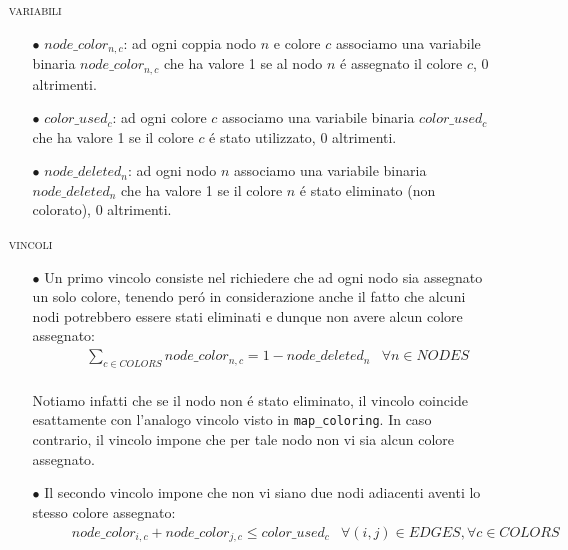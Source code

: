 \documentclass{article}
\begin{document}
\begin{itemize}
\item[] \textsc{variabili}
	\begin{itemize}
	\item[$\bullet$] $node\_color_{n,c}$: ad ogni coppia nodo $n$ e colore $c$ associamo una variabile binaria $node\_color_{n,c}$ che ha valore 1 se al nodo $n$ \'e assegnato il colore $c$, 0 altrimenti.\\
	\item[$\bullet$] $color\_used_{c}$: ad ogni colore $c$ associamo una variabile binaria $color\_used_{c}$ che ha valore 1 se il colore $c$ \'e stato utilizzato, 0 altrimenti.\\
	\item[$\bullet$] $node\_deleted_{n}$: ad ogni nodo $n$ associamo una variabile binaria $node\_deleted_{n}$ che ha valore 1 se il colore $n$ \'e stato eliminato (non colorato), 0 altrimenti.\\
	\end{itemize}
	
\item[] \textsc{vincoli}
	\begin{itemize}
	\item[$\bullet$] Un primo vincolo consiste nel richiedere che ad ogni nodo sia assegnato un solo colore, tenendo per\'o in considerazione anche il fatto che alcuni nodi potrebbero essere stati eliminati e dunque non avere alcun colore assegnato:\\
	\begin{equation*}
	\begin{aligned}
	& & &  \sum\limits_{c \in COLORS} node\_color_{n,c} = 1 - node\_deleted_{n} & \forall n \in NODES\\ 
	\end{aligned}
	\end{equation*}
	
	Notiamo infatti che se il nodo non \'e stato eliminato, il vincolo coincide esattamente con l'analogo vincolo visto in \texttt{map\_coloring}. In caso contrario, il vincolo impone che per tale nodo non vi sia alcun colore assegnato.\\
	
	\item[$\bullet$] Il secondo vincolo impone che non vi siano due nodi adiacenti aventi lo stesso colore assegnato:\\
	\begin{equation*}
	\begin{aligned}
	& & &  node\_color_{i,c} + node\_color_{j,c} \le color\_used_{c} & \forall (i,j) \in EDGES, \forall c \in COLORS\\
	

\end{aligned}
\end{equation*}
\end{itemize}
\end{itemize}
\end{document}
